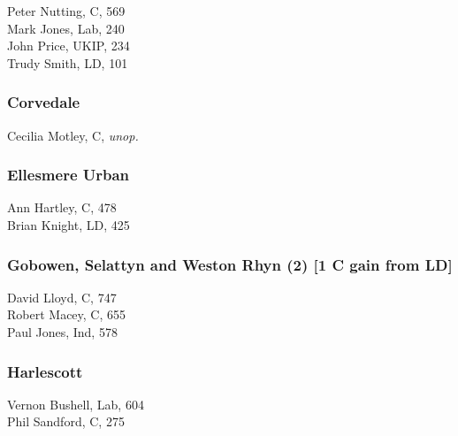 \documentclass[a4paper,openany,10pt]{book}
\begin{document}


Peter Nutting, C, 569\\
Mark Jones, Lab, 240\\
John Price, UKIP, 234\\
Trudy Smith, LD, 101\\


\subsubsection*{Corvedale}



Cecilia Motley, C, \emph{unop.}\\


\subsubsection*{Ellesmere Urban}



Ann Hartley, C, 478\\
Brian Knight, LD, 425\\


\subsubsection*{Gobowen, Selattyn and Weston Rhyn (2) \hspace*{\fill}\nolinebreak[1]%
\enspace\hspace*{\fill}
[1 C gain from LD]}



David Lloyd, C, 747\\
Robert Macey, C, 655\\
Paul Jones, Ind, 578\\


\subsubsection*{Harlescott}



Vernon Bushell, Lab, 604\\
Phil Sandford, C, 275\\
\end{document}
